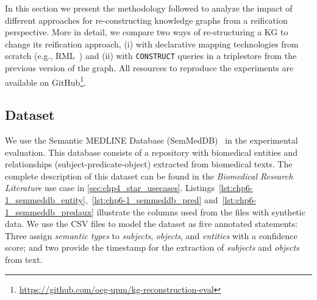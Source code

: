 In this section we present the methodology followed to analyze the impact of different approaches for re-constructing knowledge graphs from a reification perspective. More in detail, we compare two ways of re-structuring a KG to change its reification approach, (i) with declarative mapping technologies from scratch (e.g., RML~\parencite{Dimou2014rml,iglesias2023rml}) and (ii) with \texttt{CONSTRUCT} queries in a triplestore from the previous version of the graph. 
All resources to reproduce the experiments are available on GitHub\footnote{\url{https://github.com/oeg-upm/kg-reconstruction-eval}}.



\subsection{Dataset}
\label{sec:chp6-1_dataset}


We use the Semantic MEDLINE Database (SemMedDB)~\parencite{SemMedDB} in the experimental evaluation. This database consists of a repository with biomedical entities and relationships (subject-predicate-object) extracted from biomedical texts. The complete description of this dataset can be found in the \textit{Biomedical Research Literature} use case in \cref{sec:chp4_star_usecases}. Listings~\ref{lst:chp6-1_semmeddb_entity},~\ref{lst:chp6-1_semmeddb_pred} and~\ref{lst:chp6-1_semmeddb_predaux} illustrate the columns used from the files with synthetic data.
We use the CSV files to model the dataset as five annotated statements: 
Three assign \textit{semantic types} to \textit{subjects}, \textit{objects}, and \textit{entities} with a confidence score; and two provide the timestamp for the extraction of \textit{subjects} and \textit{objects} from text. 


